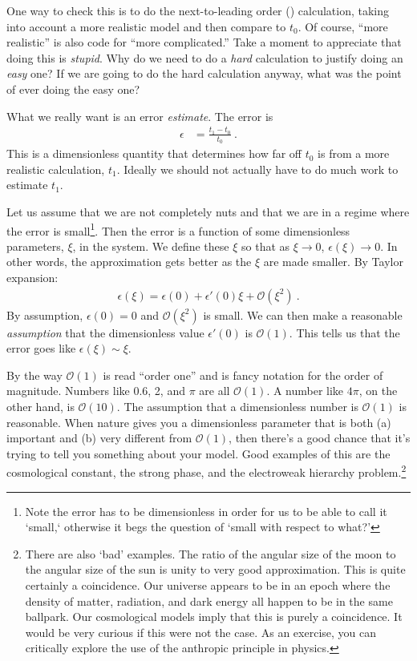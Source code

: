 \documentclass[
  11pt,
	colorful,
	raggedright,
]{tufte-style-thesis-flip}
\begin{document}
One way to check this is to do the next-to-leading order () calculation, taking into account a more realistic model and then compare to $t_0$. Of course, ``more realistic'' is also code for ``more complicated.'' Take a moment to appreciate that doing this is \emph{stupid}. Why do we need to do a \emph{hard} calculation to justify doing an \emph{easy} one? If we are going to do the hard calculation anyway, what was the point of ever doing the easy one?

What we really want is an error \emph{estimate}. The error is
\begin{align}
  \epsilon &= \frac{t_1 - t_0}{t_0} \ .
\end{align}
This is a dimensionless quantity that determines how far off $t_0$ is from a more realistic calculation, $t_1$. Ideally we should not actually have to do much work to estimate $t_1$. 

Let us assume that we are not completely nuts and that we are in a regime where the error is small\footnote{Note the error has to be dimensionless in order for us to be able to call it `small,` otherwise it begs the question of `small with respect to what?'}. Then the error is a function of some dimensionless parameters, $\xi$, in the system. We define these $\xi$ so that as $\xi \to 0$, $\epsilon(\xi) \to 0$. In other words, the approximation gets better as the $\xi$ are made smaller. By Taylor expansion:
\begin{align}
  \epsilon(\xi) = \epsilon(0) + \epsilon'(0) \xi + \mathcal O(\xi^2) \ .
\end{align}
By assumption, $\epsilon(0) = 0$ and $\mathcal O(\xi^2)$ is  small. We can then make a reasonable \emph{assumption} that the dimensionless value $\epsilon'(0)$  is $\mathcal O(1)$. This tells us that the error goes like $\epsilon(\xi) \sim \xi$.

By the way $\mathcal O(1)$ is read ``order one'' and is fancy notation for the order of magnitude. Numbers like 0.6, 2, and $\pi$ are all $\mathcal O(1)$. A number like $4\pi$, on the other hand, is $\mathcal O(10)$.  The assumption that a dimensionless number is $\mathcal O(1)$ is reasonable. When nature gives you a dimensionless parameter that is both (a) important and (b) very different from $\mathcal O(1)$, then there's a good chance that it's trying to tell you something about your model. Good examples of this are the cosmological constant, the strong  phase, and the electroweak hierarchy problem.\footnote{There are also `bad' examples. The ratio of the angular size of the moon to the angular size of the sun is unity to very good approximation. This is quite certainly a coincidence. Our universe appears to be in an epoch where the density of matter, radiation, and dark energy all happen to be in the same ballpark. Our cosmological models imply that this is purely a coincidence. It would be very curious if this were not the case. As an exercise, you can critically explore the use of the anthropic principle in physics.} 
\end{document}
